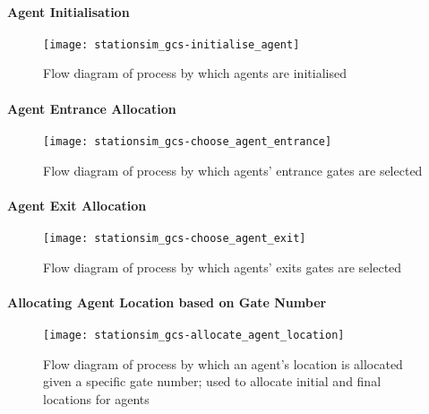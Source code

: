 \paragraph{Agent Initialisation}\label{para:submodels:agent_init}

\begin{figure}[h]
    \centering
    \texttt{[image: stationsim\_gcs-initialise\_agent]}
    \caption{Flow diagram of process by which agents are initialised}
    \label{fig:flow:agent_initialisation}
\end{figure}

\paragraph{Agent Entrance Allocation}\label{para:submodels:agent_entrance}

\begin{figure}[h]
    \centering
    \texttt{[image: stationsim\_gcs-choose\_agent\_entrance]}
    \caption{Flow diagram of process by which agents' entrance gates are
    selected}
    \label{fig:flow:agent_entrance}
\end{figure}

\paragraph{Agent Exit Allocation}\label{para:submodels:agent_exit}

\begin{figure}[h]
    \centering
    \texttt{[image: stationsim\_gcs-choose\_agent\_exit]}
    \caption{Flow diagram of process by which agents' exits gates are selected}
    \label{fig:flow:agent_exit}
\end{figure}

\paragraph{Allocating Agent Location based on Gate
Number}\label{para:submodels:location_allocation}

\begin{figure}[h]
    \centering
    \texttt{[image: stationsim\_gcs-allocate\_agent\_location]}
    \caption{Flow diagram of process by which an agent's location is allocated
    given a specific gate number; used to allocate initial and final locations
    for agents}
    \label{fig:flow:allocate_agent_location}
\end{figure}


